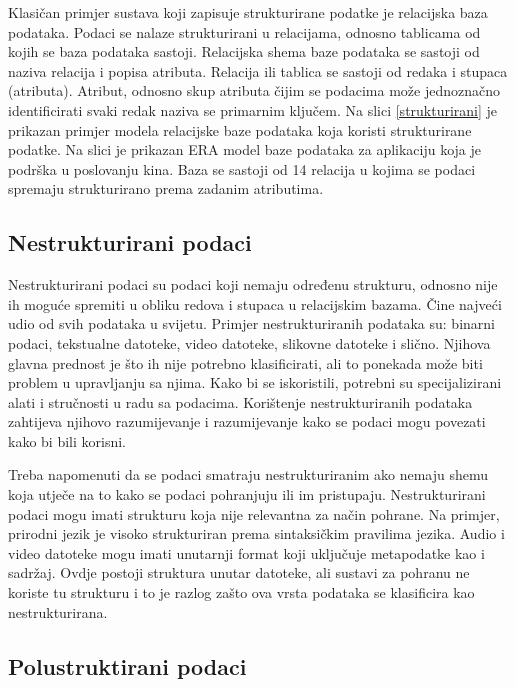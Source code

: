 \documentclass{foi}
\begin{document}
Klasičan primjer sustava koji zapisuje strukturirane podatke je relacijska baza podataka. Podaci se nalaze strukturirani u relacijama, odnosno tablicama od kojih se baza podataka sastoji. Relacijska shema baze podataka se sastoji od naziva relacija i popisa atributa. Relacija ili tablica se sastoji od redaka i stupaca (atributa). Atribut, odnosno skup atributa čijim se podacima može jednoznačno identificirati svaki redak naziva se primarnim ključem. \cite{informacijskaTehnologijauPoslovanju} Na slici \ref{strukturirani} je prikazan primjer modela relacijske baze podataka koja koristi strukturirane podatke. Na slici je prikazan ERA model baze podataka za aplikaciju koja je podrška u poslovanju kina. Baza se sastoji od 14 relacija u kojima se podaci spremaju strukturirano prema zadanim atributima.

\subsection{Nestrukturirani podaci}

Nestrukturirani podaci su podaci koji nemaju određenu strukturu, odnosno nije ih moguće spremiti u obliku redova i stupaca u relacijskim bazama. Čine najveći udio od svih podataka u svijetu. Primjer nestrukturiranih podataka su: binarni podaci, tekstualne datoteke, video datoteke, slikovne datoteke i slično. Njihova glavna prednost je što ih nije potrebno klasificirati, ali to ponekada može biti problem u upravljanju sa njima. Kako bi se iskoristili, potrebni su specijalizirani alati i stručnosti u radu sa podacima. Korištenje nestrukturiranih podataka zahtijeva njihovo razumijevanje i razumijevanje kako se podaci mogu povezati kako bi bili korisni. \cite{unstructuredStructuredSemiStructured}

Treba napomenuti da se podaci smatraju nestrukturiranim ako nemaju shemu koja utječe na to kako se podaci pohranjuju ili im pristupaju. Nestrukturirani podaci mogu imati strukturu koja nije relevantna za način pohrane. Na primjer, prirodni jezik je visoko strukturiran prema sintaksičkim pravilima jezika. Audio i video datoteke mogu imati unutarnji format koji uključuje metapodatke kao i sadržaj. Ovdje postoji struktura unutar datoteke, ali sustavi za pohranu ne koriste tu strukturu i to je razlog zašto ova vrsta podataka se klasificira kao nestrukturirana. \cite{dataEngineerStudyGuide} 

\subsection{Polustruktirani podaci}
\end{document}
